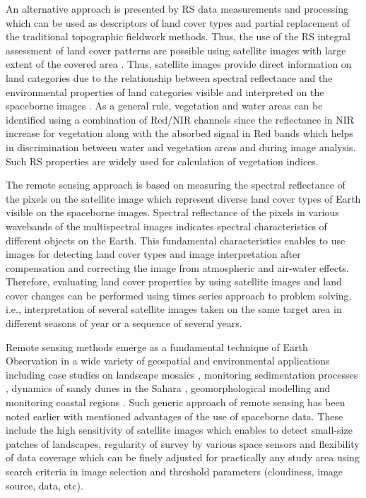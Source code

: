 \documentclass[land,article,submit,pdftex,moreauthors]{Definitions/mdpi}
\begin{document}
An alternative approach is presented by RS data measurements and processing which can be used as descriptors of land cover types and partial replacement of the traditional topographic fieldwork methods. Thus, the use of the RS integral assessment of land cover patterns are possible using satellite images with large extent of the covered area \cite{ELGHOUL2023106733}. Thus, satellite images provide direct information on land categories due to the relationship between spectral reflectance and the environmental properties of land categories visible and interpreted on the spaceborne images \cite{Allouche,Ruiz,Ray}. As a general rule, vegetation and water areas can be identified using a combination of Red/NIR channels since the reflectance in NIR increase for vegetation along with the absorbed signal in Red bands which helps in discrimination between water and vegetation areas and during image analysis. Such RS properties are widely used for calculation of vegetation indices. 

The remote sensing approach is based on measuring the spectral reflectance of the pixels on the satellite image which represent diverse land cover types of Earth visible on the spaceborne images. Spectral reflectance of the pixels in various wavebands of the multispectral images indicates spectral characteristics of different objects on the Earth. This fundamental characteristics enables to use images for detecting land cover types and image interpretation after compensation and correcting the image from atmospheric and air-water effects. Therefore, evaluating land cover properties by using satellite images and land cover changes can be performed using times series approach to problem solving, i.e., interpretation of several satellite images taken on the same target area in different seasons of year or a sequence of several years. 

Remote sensing methods emerge as a fundamental technique of Earth Observation in a wide variety of geospatial and environmental applications including case studies on landscape mosaics \cite{BIARNES2021103281}, monitoring sedimentation processes \cite{TOWNSHEND1989177}, dynamics of sandy dunes in the Sahara \cite{Afrasinei}, geomorphological modelling \cite{Desprats} and monitoring coastal regions \cite{AMROUNI201973,Jaquet}. Such generic approach of remote sensing has been noted earlier \cite{RAMPHERI2023103359} with mentioned advantages of the use of spaceborne data. These include the high sensitivity of satellite images which enables to detect small-size patches of landscapes, regularity of survey by various space sensors and flexibility of data coverage which can be finely adjusted for practically any study area using search criteria in image selection and threshold parameters (cloudiness, image source, data, etc). 
\end{document}

